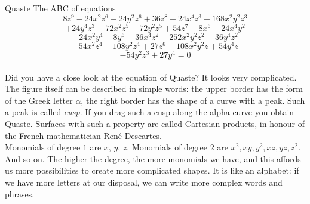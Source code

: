 \begin{surferPage}{Quaste}
The ABC of equations
  \smallskip
\[8z^9-24x^2z^6-24y^2z^6+36z^8+24x^4z^3-168x^2y^2z^3\]
\[+24y^4z^3-72x^2z^5-72y^2z^5+54z^7-8x^6-24x^4y^2\]
\[-24x^2y^4-8y^6 + 36x^4z^2-252x^2y^2z^2+36y^4z^2\]
\[- 54x^2z^4-108y^2z^4 + 27z^6-108x^2y^2z + 54y^4z\]
\[-54y^2z^3 + 27y^4 = 0\]\\
\vspace{0.3cm}
Did you have a close look at the equation of Quaste? It  looks very complicated.
The figure itself can be described in simple words: the upper border has the form of the Greek letter $\alpha$, the right border has the shape of a curve with a peak. Such a peak is called {\it cusp}. If you drag such a cusp along the alpha curve you obtain Quaste. Surfaces with such a property are called Cartesian products, in honour of the French mathematician  Ren\'e Descartes.\\
\vspace{0.3cm}
Monomials of degree $1$ are $x$, $y$, $z$. Monomials of degree $2$ are $x^2, xy, y^2, xz, yz, z^2$. And so on. The higher the degree, the more monomials we have, and this affords us more possibilities to create more complicated shapes. It is like an alphabet: if we have more letters at our disposal, we can write more complex words and phrases.
\end{surferPage}
